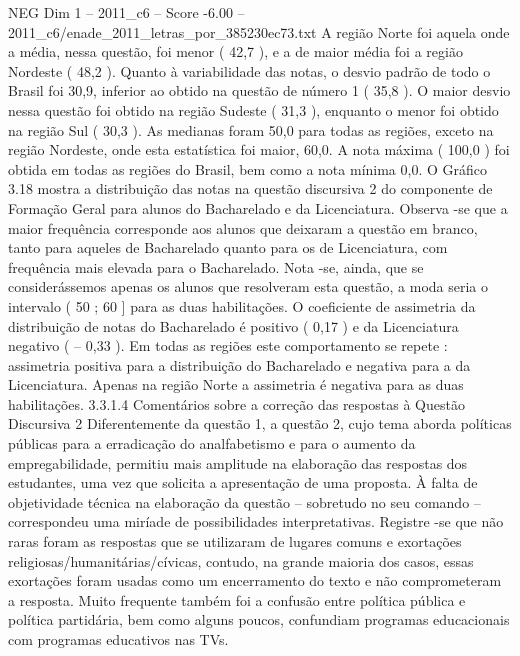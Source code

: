 \begin{textsample}{NEG Dim 1 – 2011\_c6 – Score -6.00 – 2011\_c6/enade\_2011\_letras\_por\_385230ec73.txt}
A região Norte foi aquela onde a média, nessa questão, foi menor ( 42,7 ), e a de maior média foi a região Nordeste ( 48,2 ).
Quanto à variabilidade das notas, o desvio padrão de todo o Brasil foi 30,9, inferior ao obtido na questão de número 1 ( 35,8 ).
O maior desvio nessa questão foi obtido na região Sudeste ( 31,3 ), enquanto o menor foi obtido na região Sul ( 30,3 ).
As medianas foram 50,0 para todas as regiões, exceto na região Nordeste, onde esta estatística foi maior, 60,0.
A nota máxima ( 100,0 ) foi obtida em todas as regiões do Brasil, bem como a nota mínima 0,0.
O Gráfico 3.18 mostra a distribuição das notas na questão discursiva 2 do componente de Formação Geral para alunos do Bacharelado e da Licenciatura.
Observa -se que a maior frequência corresponde aos alunos que deixaram a questão em branco, tanto para aqueles de Bacharelado quanto para os de Licenciatura, com frequência mais elevada para o Bacharelado.
Nota -se, ainda, que se considerássemos apenas os alunos que resolveram esta questão, a moda seria o intervalo ( 50 ; 60 ] para as duas habilitações.
O coeficiente de assimetria da distribuição de notas do Bacharelado é positivo ( 0,17 ) e da Licenciatura negativo ( – 0,33 ).
Em todas as regiões este comportamento se repete : assimetria positiva para a distribuição do Bacharelado e negativa para a da Licenciatura.
Apenas na região Norte a assimetria é negativa para as duas habilitações. 3.3.1.4 Comentários sobre a correção das respostas à Questão Discursiva 2 Diferentemente da questão 1, a questão 2, cujo tema aborda políticas públicas para a erradicação do analfabetismo e para o aumento da empregabilidade, permitiu mais amplitude na elaboração das respostas dos estudantes, uma vez que solicita a apresentação de uma proposta.
À falta de objetividade técnica na elaboração da questão – sobretudo no seu comando – correspondeu uma miríade de possibilidades interpretativas.
Registre -se que não raras foram as respostas que se utilizaram de lugares comuns e exortações religiosas/humanitárias/cívicas, contudo, na grande maioria dos casos, essas exortações foram usadas como um encerramento do texto e não comprometeram a resposta.
Muito frequente também foi a confusão entre política pública e política partidária, bem como alguns poucos, confundiam programas educacionais com programas educativos nas TVs.

\end{textsample}
